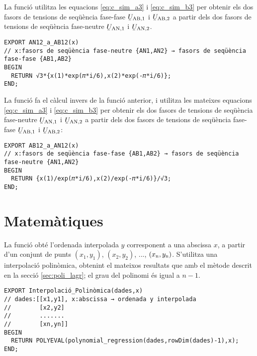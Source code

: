 La funció  utilitza les equacions  \eqref{eq:c_sim_a3} i \eqref{eq:c_sim_b3} per obtenir els dos fasors de tensions de seqüència fase-fase $\cmplx{U}\ped{AB,1}$ i  $\cmplx{U}\ped{AB,2}$ a partir dels dos fasors de tensions de seqüència fase-neutre $\cmplx{U}\ped{AN,1}$ i $\cmplx{U}\ped{AN,2}$.

\begin{lstlisting}[caption={HP Prime --- Funció AN12\_a\_AB12}, label=lst:AN12aAB12]
EXPORT AN12_a_AB12(x)
// x:fasors de seqüència fase-neutre {AN1,AN2} → fasors de seqüència fase-fase {AB1,AB2}
BEGIN
  RETURN √3*{x(1)*exp(𝜋*i/6),x(2)*exp(-𝜋*i/6)};
END;
\end{lstlisting}

La funció  fa el càlcul invers de la funció anterior, i utilitza les mateixes equacions  \eqref{eq:c_sim_a3} i \eqref{eq:c_sim_b3} per obtenir els dos fasors de tensions de seqüència fase-neutre $\cmplx{U}\ped{AN,1}$ i $\cmplx{U}\ped{AN,2}$ a partir dels dos fasors de tensions de seqüència fase-fase $\cmplx{U}\ped{AB,1}$ i  $\cmplx{U}\ped{AB,2}$:

\begin{lstlisting}[caption={HP Prime --- Funció AB12\_a\_AN12}, label=lst:AB12aAN12]
EXPORT AB12_a_AN12(x)
// x:fasors de seqüència fase-fase {AB1,AB2} → fasors de seqüència fase-neutre {AN1,AN2}
BEGIN
  RETURN {x(1)/exp(𝜋*i/6),x(2)/exp(-𝜋*i/6)}/√3;
END;
\end{lstlisting}


\section{Matemàtiques}

La funció  obté l'ordenada interpolada $y$ corresponent a una abscissa $x$, a partir d'un conjunt  de punts $(x_1,y_1)$, $(x_2,y_2)$, ..., $(x_\mathrm{n},y_\mathrm{n})$. S'utilitza una interpolació polinòmica, obtenint el mateixos resultats que amb el mètode descrit en la secció \vref{sec:poli_lagr}; el grau del polinomi és igual a $n-1$.

\begin{lstlisting}[caption={HP Prime --- Funció Interpolació\_Polinòmica}]
EXPORT Interpolació_Polinòmica(dades,x)
// dades:[[x1,y1], x:abscissa → ordenada y interpolada
//        [x2,y2]
//        .......
//        [xn,yn]]
BEGIN
  RETURN POLYEVAL(polynomial_regression(dades,rowDim(dades)-1),x);
END;
\end{lstlisting}


